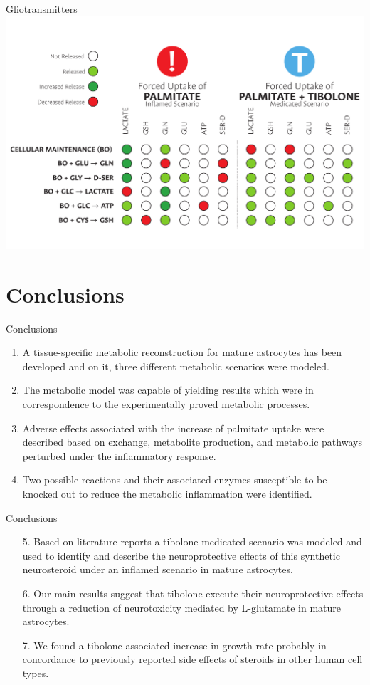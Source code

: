 \documentclass[11pt]{beamer}
\begin{document}
\begin{frame}{Gliotransmitters}
\includegraphics[width=\textwidth]{GTt}
\end{frame}
\section{Conclusions}
\begin{frame}{Conclusions}
\begin{center}
\begin{enumerate}
\item  A tissue-specific metabolic reconstruction for mature astrocytes has been developed and on it, three different metabolic scenarios were modeled.
\item The metabolic model was capable of yielding results which were in correspondence to the experimentally proved metabolic processes.
\item Adverse effects associated with the increase of palmitate uptake were described based on exchange, metabolite production, and metabolic pathways perturbed under the inflammatory response.
\item Two possible reactions and their associated enzymes susceptible to be knocked out to reduce the metabolic inflammation were identified.
\end{enumerate}
\end{center}
\end{frame}
\begin{frame}{Conclusions}
\begin{center}
\begin{enumerate}
\item[5.]  Based on literature reports a tibolone medicated scenario was modeled and used to identify and describe the neuroprotective effects of this synthetic neurosteroid under an inflamed scenario in mature astrocytes.
\item[6.] Our main results suggest that tibolone execute their neuroprotective effects through a reduction of neurotoxicity mediated by L-glutamate in mature astrocytes.
\item[7.] We found a tibolone associated increase in growth rate probably in concordance to previously reported side effects of steroids in other human cell types.
\end{enumerate}
\end{center}
\end{frame}
\end{document}
